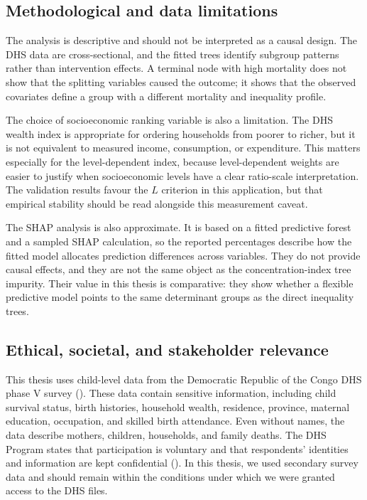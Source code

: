 \documentclass[
  11pt,
  a4paper,
]{article}
\begin{document}
\subsection{Methodological and data
limitations}\label{methodological-and-data-limitations}

The analysis is descriptive and should not be interpreted as a causal
design. The DHS data are cross-sectional, and the fitted trees identify
subgroup patterns rather than intervention effects. A terminal node with
high mortality does not show that the splitting variables caused the
outcome; it shows that the observed covariates define a group with a
different mortality and inequality profile.

The choice of socioeconomic ranking variable is also a limitation. The
DHS wealth index is appropriate for ordering households from poorer to
richer, but it is not equivalent to measured income, consumption, or
expenditure. This matters especially for the level-dependent index,
because level-dependent weights are easier to justify when socioeconomic
levels have a clear ratio-scale interpretation. The validation results
favour the \(L\) criterion in this application, but that empirical
stability should be read alongside this measurement caveat.

The SHAP analysis is also approximate. It is based on a fitted
predictive forest and a sampled SHAP calculation, so the reported
percentages describe how the fitted model allocates prediction
differences across variables. They do not provide causal effects, and
they are not the same object as the concentration-index tree impurity.
Their value in this thesis is comparative: they show whether a flexible
predictive model points to the same determinant groups as the direct
inequality trees.

\subsection{Ethical, societal, and stakeholder
relevance}\label{ethical-societal-and-stakeholder-relevance}

This thesis uses child-level data from the Democratic Republic of the
Congo DHS phase V survey (). These data contain sensitive information,
including child survival status, birth histories, household wealth,
residence, province, maternal education, occupation, and skilled birth
attendance. Even without names, the data describe mothers, children,
households, and family deaths. The DHS Program states that participation
is voluntary and that respondents' identities and information are kept
confidential (). In this thesis, we used secondary survey data and should remain
within the conditions under which we were granted access to the DHS
files.
\end{document}
